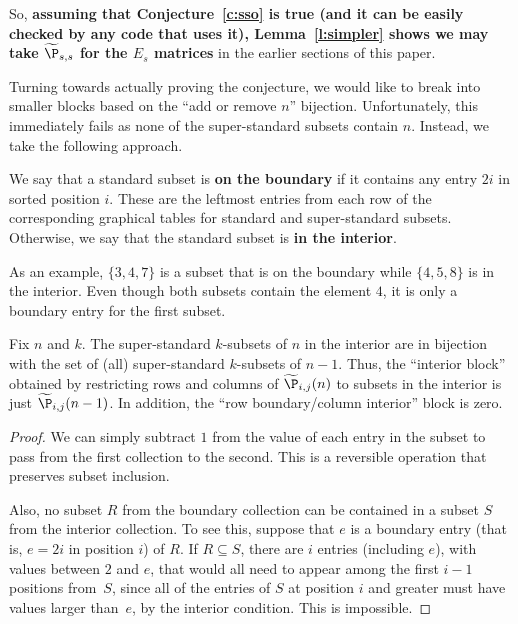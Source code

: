 So, {\bf assuming that Conjecture~\ref{c:sso} is true (and it can be easily checked by any code that uses it), Lemma~\ref{l:simpler} shows we may take $\widetilde\P_{s,s}$ for the $E_s$ matrices} in the earlier sections of this paper.  

Turning towards actually proving the conjecture, we would like to break into smaller blocks based on the ``add or remove $n$'' bijection.  Unfortunately, this immediately fails as none of the super-standard subsets contain $n$.  Instead, we take the following approach.

\begin{definition}
We say that a standard subset is {\bf on the boundary} if it contains any entry $2i$ in sorted position $i$.  These are the leftmost entries from each row of the corresponding graphical tables for standard and super-standard subsets.  Otherwise, we say that the standard subset is {\bf in the interior}.
\end{definition}

As an example, $\{3, 4, 7\}$ is a subset that is on the boundary while $\{4, 5, 8\}$ is in the interior.  Even though both subsets contain the element $4$, it is only a boundary entry for the first subset.

\begin{proposition}
Fix $n$ and $k$.  The super-standard $k$-subsets of $n$ in the interior are in bijection with the set of (all) super-standard $k$-subsets of $n-1$.  Thus, the ``interior block'' obtained by restricting rows and columns of $\widetilde\P_{i,j}(n)$ to subsets in the interior is just $\widetilde\P_{i,j}(n-1)$.  In addition, the ``row boundary/column interior'' block is zero.
\end{proposition}
\begin{proof}
We can simply subtract $1$ from the value of each entry in the subset to pass from the first collection to the second.  This is a reversible operation that preserves subset inclusion.

Also, no subset $R$ from the boundary collection can be contained in a subset $S$ from the interior collection.  To see this, suppose that $e$ is a boundary entry (that is, $e = 2i$ in position $i$) of $R$.  If $R \subseteq S$, there are $i$ entries (including $e$), with values between $2$ and $e$, that would all need to appear among the first $i-1$ positions from~$S$, since all of the entries of $S$ at position $i$ and greater must have values larger than~$e$, by the interior condition.  This is impossible.
\end{proof}

